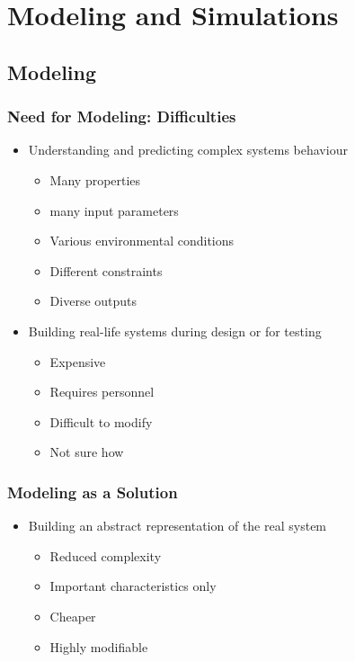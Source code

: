 \section{Modeling and Simulations}
\subsection{Modeling}
\subsubsection{Need for Modeling: Difficulties}
\begin{itemize}
	\item Understanding and predicting complex systems behaviour
	\begin{itemize}
		\item Many properties
		\item many input parameters
		\item Various environmental conditions
		\item Different constraints
		\item Diverse outputs
	\end{itemize}
	\item Building real-life systems during design or for testing
	\begin{itemize}
		\item Expensive
		\item Requires personnel
		\item Difficult to modify
		\item Not sure how
	\end{itemize}
\end{itemize}

\subsubsection{Modeling as a Solution}
\begin{itemize}
	\item Building an abstract representation of the real system
	\begin{itemize}
		\item Reduced complexity
		\item Important characteristics only
		\item Cheaper
		\item Highly modifiable
	\end{itemize}
\end{itemize}

